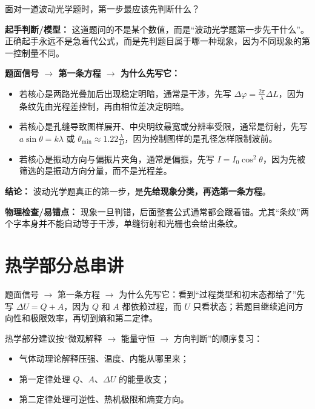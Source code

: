 \documentclass[lang=cn,11pt]{elegantbook}
\newcommand{\bridge}[1]{\begin{note}#1\end{note}}
\begin{document}
\begin{exercise}[光学复习的第一步]
面对一道波动光学题时，第一步最应该先判断什么？
\end{exercise}

\begin{solution}
\textbf{起手判断/模型：} 这道题问的不是某个数值，而是“波动光学题第一步先干什么”。正确起手永远不是急着代公式，而是先判题目属于哪一种现象，因为不同现象的第一控制量不同。

\textbf{题面信号 \(\rightarrow\) 第一条方程 \(\rightarrow\) 为什么先写它：}
\begin{itemize}
  \item 若核心是两路光叠加后出现稳定明暗，通常是干涉，先写 \(\Delta\varphi=\frac{2\pi}{\lambda}\Delta L\)，因为条纹先由光程差控制，再由相位差决定明暗。
  \item 若核心是孔缝导致图样展开、中央明纹最宽或分辨率受限，通常是衍射，先写 \(a\sin\theta=k\lambda\) 或 \(\theta_{\min}\approx 1.22\frac{\lambda}{D}\)，因为控制图样的是孔径怎样限制波前。
  \item 若核心是振动方向与偏振片夹角，通常是偏振，先写 \(I=I_0\cos^2\theta\)，因为先被筛选的是振动方向分量，而不是光程差。
\end{itemize}

\textbf{结论：} 波动光学题真正的第一步，是\textbf{先给现象分类，再选第一条方程}。

\textbf{物理检查/易错点：} 现象一旦判错，后面整套公式通常都会跟着错。尤其“条纹”两个字本身并不能自动等于干涉，单缝衍射和光栅也会给出条纹。
\end{solution}

\section{热学部分总串讲}

\bridge{题面信号 \(\rightarrow\) 第一条方程 \(\rightarrow\) 为什么先写它：看到“过程类型和初末态都给了”先写 \(\Delta U=Q+A\)，因为 \(Q\) 和 \(A\) 都依赖过程，而 \(U\) 只看状态；若题目继续追问方向性和极限效率，再切到熵和第二定律。}

热学部分建议按“微观解释 \(\rightarrow\) 能量守恒 \(\rightarrow\) 方向判断”的顺序复习：
\begin{itemize}
  \item 气体动理论解释压强、温度、内能从哪里来；
  \item 第一定律处理 \(Q\)、\(A\)、\(\Delta U\) 的能量收支；
  \item 第二定律处理可逆性、热机极限和熵变方向。
\end{itemize}
\end{document}
